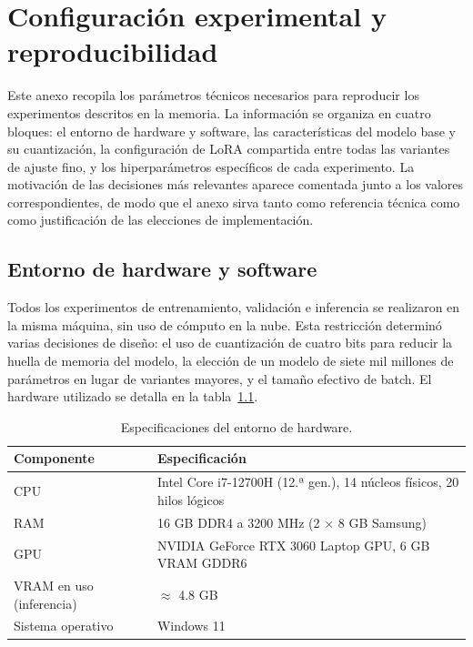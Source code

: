 %
\chapter{Configuración experimental y reproducibilidad}
\label{ch::AnexoA}

Este anexo recopila los parámetros técnicos necesarios para reproducir los experimentos descritos en la memoria. La información se organiza en cuatro bloques: el entorno de
hardware y software, las características del modelo base y su cuantización, la configuración de LoRA compartida entre todas las variantes de ajuste fino, y los hiperparámetros
específicos de cada experimento. La motivación de las decisiones más relevantes aparece comentada junto a los valores correspondientes, de modo que el anexo sirva tanto como
referencia técnica como como justificación de las elecciones de implementación.

\section{Entorno de hardware y software}

Todos los experimentos de entrenamiento, validación e inferencia se realizaron en la misma máquina, sin uso de cómputo en la nube. Esta restricción determinó varias decisiones
de diseño: el uso de cuantización de cuatro bits para reducir la huella de memoria del modelo, la elección de un modelo de siete mil millones de parámetros en lugar de variantes
mayores, y el tamaño efectivo de batch. El hardware utilizado se detalla en la tabla~\ref{tab:AnexoA_hardware}.

\begin{table}[htbp]
\centering
\caption{Especificaciones del entorno de hardware.}
\label{tab:AnexoA_hardware}
\small
\begin{tabularx}{\textwidth}{lX}
\toprule
\textbf{Componente} & \textbf{Especificación} \\
\midrule
CPU & Intel Core i7-12700H (12.ª gen.), 14 núcleos físicos, 20 hilos lógicos \\
RAM & 16 GB DDR4 a 3200 MHz (2 $\times$ 8 GB Samsung) \\
GPU & NVIDIA GeForce RTX 3060 Laptop GPU, 6 GB VRAM GDDR6 \\
VRAM en uso (inferencia) & $\approx$ 4.8 GB \\
Sistema operativo & Windows 11 \\
\bottomrule
\end{tabularx}
\end{table}


